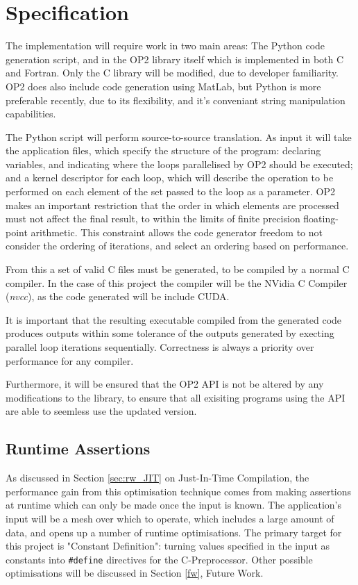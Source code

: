 
\section{Specification}
The implementation will require work in two main areas: The Python code generation script, and in the OP2 library itself which is implemented in both C and Fortran. Only the C library will be modified, due to developer familiarity. OP2 does also include code generation using MatLab, but Python is more preferable recently, due to its flexibility, and it's conveniant string manipulation capabilities.
\par
The Python script will perform source-to-source translation. As input it will take the application files, which specify the structure of the program: declaring variables, and indicating where the loops parallelised by OP2 should be executed; and a kernel descriptor for each loop, which will describe the operation to be performed on each element of the set passed to the loop as a parameter. OP2 makes an important restriction that the order in which elements are processed must not affect the final result, to within the limits of finite precision floating-point arithmetic\cite[p3]{op2main}. This constraint allows the code generator freedom to not consider the ordering of iterations, and select an ordering based on performance.
\par
From this a set of valid C files must be generated, to be compiled by a normal C compiler. In the case of this project the compiler will be the NVidia C Compiler (\textit{nvcc}), as the code generated will be include CUDA.
\par
It is important that the resulting executable compiled from the generated code produces outputs within some tolerance of the outputs generated by execting parallel loop iterations sequentially. Correctness is always a priority over performance for any compiler.
\par
Furthermore, it will be ensured that the OP2 API is not be altered by any modifications to the library, to ensure that all exisiting programs using the API are able to seemless use the updated version.

\subsection{Runtime Assertions}
As discussed in Section \ref{sec:rw_JIT} on Just-In-Time Compilation, the performance gain from this optimisation technique comes from making assertions at runtime which can only be made once the input is known. The application's input will be a mesh over which to operate, which includes a large amount of data, and opens up a number of runtime optimisations. The primary target for this project is "Constant Definition": turning values specified in the input as constants into \verb|#define| directives for the C-Preprocessor. Other possible optimisations will be discussed in Section \ref{fw}, Future Work.\\

